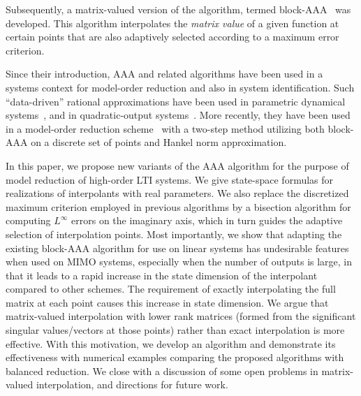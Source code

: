 \documentclass[letterpaper, 10 pt, conference]{ieeeconf}  %
\begin{document}
Subsequently, a matrix-valued version of the algorithm, termed  
 block-AAA~\cite{gosea2021algorithms} was developed. This algorithm interpolates the {\em matrix value} of a given function at certain points that are also  adaptively selected according to a maximum error criterion. 

Since their introduction, AAA and related algorithms have been used in a systems context for  model-order reduction and also in system identification.  
Such ``data-driven'' rational approximations have been used in  parametric dynamical systems~\cite{Rodriguez23}, and in quadratic-output systems~\cite{gosea2021datadriven}.  More recently, they 
have been used in a model-order reduction scheme~\cite{yu2023leveraging} with a two-step method  utilizing both block-AAA on a discrete set of points and Hankel norm approximation.

In this paper, we propose new variants of the AAA algorithm for the purpose of model reduction of high-order LTI systems. We give state-space formulas for realizations of interpolants with real parameters. We also replace the discretized maximum criterion employed in previous algorithms by a bisection algorithm for computing $L^\infty$ errors on the imaginary axis, which in turn guides the adaptive selection of interpolation points. Most importantly, we show that adapting the existing block-AAA algorithm for use on linear systems has undesirable features when used on MIMO systems, especially when the number of outputs is large, in that it leads to a rapid increase in the state dimension of the interpolant compared to other schemes. The requirement of exactly interpolating the full matrix at each point causes this increase in state dimension. We argue that matrix-valued interpolation with lower rank matrices (formed from the significant singular values/vectors at those points) rather than exact interpolation is more effective. With this motivation, we develop an algorithm and demonstrate its effectiveness with numerical examples comparing the proposed algorithms with balanced reduction. We close with a discussion of some open problems in matrix-valued interpolation, and directions for future work. 
\end{document}
